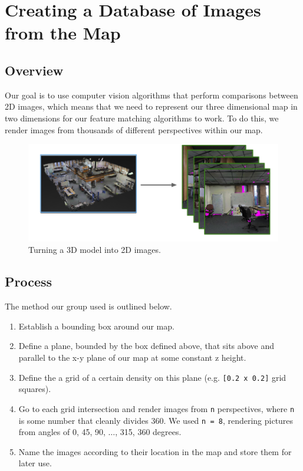 \documentclass[a4paper,11pt]{article}
\begin{document}
   \section{Creating a Database of Images from the Map}
   \subsection{Overview}
  Our goal is to use computer vision algorithms that perform comparisons between 2D images, which means that we need to represent our three dimensional map in two dimensions for our feature matching algorithms to work. To do this, we render images from thousands of different perspectives within our map.

  \begin{figure}
   \centering
     \includegraphics[width=\textwidth]{../Artifacts/RenderImages}
   \caption{Turning a 3D model into 2D images.}
   \label{fig:render}
  \end{figure}
 
 \subsection{Process}
The method our group used is outlined below.

  \begin{enumerate}
  \item Establish a bounding box around our map.
  \item Define a plane, bounded by the box defined above, that sits above and parallel to the x-y plane of our map at some constant z height.
  \item Define the a grid of a certain density on this plane (e.g. \texttt{[0.2 x 0.2]} grid squares).
  \item Go to each grid intersection and render images from \texttt{n} perspectives, where \texttt{n} is some number that cleanly divides 360. We used \texttt{n = 8}, rendering pictures from angles of 0, 45, 90, $\dots$, 315, 360 degrees.
  \item Name the images according to their location in the map and store them for later use.
  \end{enumerate} 
\end{document}
